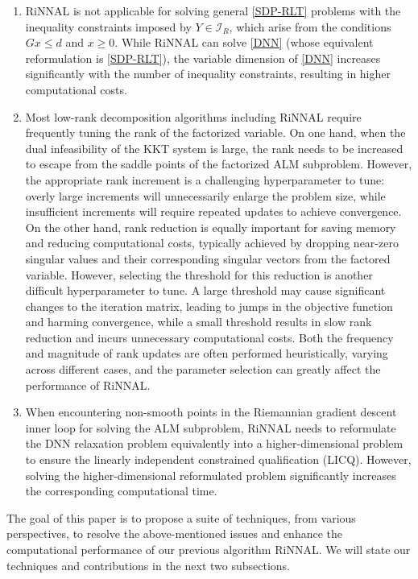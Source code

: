 \documentclass[11pt]{article}
\theoremstyle{plain}
\def\I{\mathcal{I}}
\begin{document}
\begin{enumerate} 
\item RiNNAL is not applicable for solving general \eqref{SDP-RLT} problems with the inequality constraints imposed by $Y\in\I_R$, which arise from the conditions $Gx\leq d$ and $x\geq 0$. While RiNNAL can solve \eqref{DNN}
(whose equivalent reformulation is \eqref{SDP-RLT}), the variable dimension of \eqref{DNN} increases significantly with the number of inequality constraints, resulting in higher computational costs.

\item Most low-rank decomposition algorithms  \cite{wang2023decomposition, wang2023solving, tang2024feasible,RiNNAL,monteiro2024low} including RiNNAL require frequently tuning the rank of the factorized variable. On one hand, when the dual infeasibility of the KKT system is large, the rank needs to be increased to escape from the saddle points of the factorized ALM subproblem. However, the appropriate rank increment is a challenging hyperparameter to tune: overly large increments will unnecessarily enlarge the problem size, while 
insufficient increments will require repeated updates to achieve convergence. On the other hand, rank reduction is equally important for saving memory and reducing computational costs, typically achieved by dropping near-zero singular values and their corresponding singular vectors from the factored variable. However, selecting the threshold for this reduction is another difficult hyperparameter to tune. A large threshold may cause significant changes to the iteration matrix, leading to jumps in the objective function and harming convergence, while a small threshold results in slow rank reduction and incurs unnecessary computational costs. 
Both the frequency and magnitude of rank updates are often performed heuristically, varying across different cases, and the parameter selection can greatly affect the performance of RiNNAL.

\item When encountering non-smooth points in the Riemannian gradient descent inner loop for solving the ALM subproblem, RiNNAL needs to reformulate the DNN relaxation problem equivalently into a higher-dimensional problem to ensure the linearly independent constrained qualification (LICQ). However, solving the higher-dimensional reformulated problem significantly increases the corresponding computational time.
\end{enumerate}

The goal of this paper is to propose a suite of techniques, from various perspectives, to resolve the above-mentioned issues and enhance the computational performance of our previous algorithm RiNNAL. We will state our techniques and contributions in the next two subsections.
\end{document}

